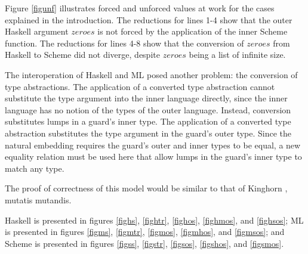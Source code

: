 Figure \ref{figunf} illustrates forced and unforced values at work for the cases explained in the introduction. The reductions for lines 1-4 show that the outer Haskell argument $zeroes$ is not forced by the application of the inner Scheme function. The reductions for lines 4-8 show that the conversion of $zeroes$ from Haskell to Scheme did not diverge, despite $zeroes$ being a list of infinite size.



The interoperation of Haskell and ML posed another problem: the conversion of type abstractions. The application of a converted type abstraction cannot substitute the type argument into the inner language directly, since the inner language has no notion of the types of the outer language. Instead, conversion substitutes lumps in a guard's inner type. The application of a converted type abstraction substitutes the type argument in the guard's outer type. Since the natural embedding \cite{matthews07} requires the guard's outer and inner types to be equal, a new equality relation must be used here that allow lumps in the guard's inner type to match any type.

The proof of correctness of this model would be similar to that of Kinghorn \cite{kinghorn07}, mutatis mutandis.

Haskell is presented in figures \ref{fighs}, \ref{fightr}, \ref{fighos}, \ref{fighmos}, and \ref{fighsos}; ML is presented in figures \ref{figms}, \ref{figmtr}, \ref{figmos}, \ref{figmhos}, and \ref{figmsos}; and Scheme is presented in figures \ref{figss}, \ref{figstr}, \ref{figsos}, \ref{figshos}, and \ref{figsmos}.

\clearpage



\clearpage



\clearpage



\clearpage



\clearpage



\clearpage



\clearpage


